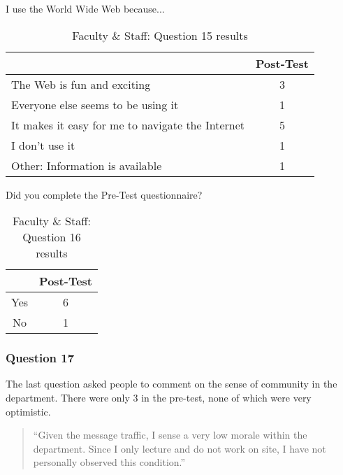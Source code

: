 \begin{table}[htbp]
\caption{Faculty \& Staff: Question 15 results}
{I use the World Wide Web because...}
\begin{center}
\begin{tabular}{|l|c|} \hline
  & {\bf Post-Test} \\ \hline 
 {The Web is fun and exciting} & 3 \\ \hline 
 {Everyone else seems to be using it} & 1 \\ \hline 
 {It makes it easy for me to navigate the Internet} & 5 \\ \hline 
 {I don't use it} & 1 \\ \hline 
 {Other: Information is available} & 1 \\ \hline 
\end{tabular}
\end{center}
\label{tab:question15a}
\end{table}

\begin{table}[htbp]
\caption{Faculty \& Staff: Question 16 results}
{Did you complete the Pre-Test questionnaire?}
\begin{center}
\begin{tabular}{|c|c|} \hline
  & {\bf Post-Test} \\ \hline 
 Yes & 6 \\ \hline 
 No  & 1 \\ \hline 
\end{tabular}
\end{center}
\label{tab:question16a}
\end{table}

\subsubsection{Question 17}

The last question asked people to comment on the sense of community in the
department.  There were only 3 in the pre-test, none of which were very
optimistic.  

\begin{quote}
``Given the message traffic, I sense a very low morale within the
department.  Since I only lecture and do not work on site, I have not
personally observed this condition.''
\end{quote}

